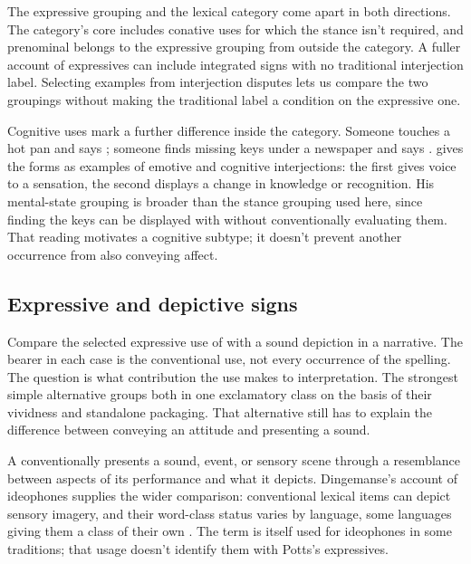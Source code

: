\documentclass[12pt]{article}
\begin{document}
The expressive grouping and the lexical category come apart in both
directions. The category's core includes conative uses for which the stance
isn't required, and prenominal  belongs to the expressive
grouping from outside the category. A fuller account of expressives can include integrated signs
with no traditional interjection label. Selecting examples from interjection
disputes lets us compare the two groupings without making the traditional
label a condition on the expressive one.

Cognitive uses mark a further difference inside the category. Someone
touches a hot pan and says ; someone finds missing keys
under a newspaper and says . \textcite[113]{ameka1992}
gives the forms as examples of emotive and cognitive interjections: the
first gives voice to a sensation, the second displays a change in
knowledge or recognition. His mental-state grouping is broader than the
stance grouping used here, since finding the keys can be displayed with
 without conventionally evaluating them. That reading
motivates a cognitive subtype; it doesn't prevent another occurrence from
also conveying affect.

\subsection{Expressive and depictive signs}\label{sec:expressive-depictive}

Compare the selected expressive use of  with a sound depiction
 in a narrative. The bearer in each case is the conventional
use, not every occurrence of the spelling. The question is what contribution
the use makes to interpretation. The strongest simple alternative groups
both in one exclamatory class on the basis of their vividness and
standalone packaging. That alternative still has to explain the difference
between conveying an attitude and presenting a sound.

A  conventionally presents a sound, event, or sensory
scene through a resemblance between aspects of its performance and what
it depicts. Dingemanse's account of ideophones supplies the wider comparison:
conventional lexical items can depict sensory imagery, and their word-class
status varies by language, some languages giving them a class of their own
\citep[2--3]{dingemanse2018}.
The term  is itself used for ideophones in some traditions;
that usage doesn't identify them with Potts's expressives.
\end{document}
